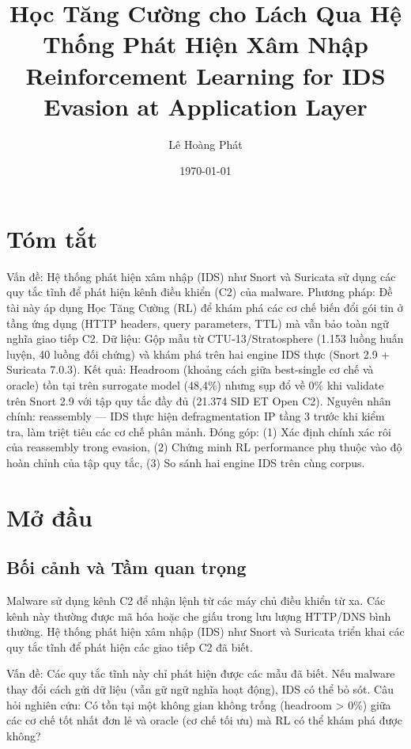 \documentclass[12pt, a4paper, openany]{book}
\title{Học Tăng Cường cho Lách Qua Hệ Thống Phát Hiện Xâm Nhập \\[0.5cm]
       \large Reinforcement Learning for IDS Evasion at Application Layer}
\author{Lê Hoàng Phát}
\date{\today}
\begin{document}
\maketitle

\chapter*{Tóm tắt}

Vấn đề: Hệ thống phát hiện xâm nhập (IDS) như Snort và Suricata sử dụng các quy tắc tĩnh để phát hiện kênh điều khiển (C2) của malware. Phương pháp: Đề tài này áp dụng Học Tăng Cường (RL) để khám phá các cơ chế biến đổi gói tin ở tầng ứng dụng (HTTP headers, query parameters, TTL) mà vẫn bảo toàn ngữ nghĩa giao tiếp C2. Dữ liệu: Gộp mẫu từ CTU-13/Stratosphere (1.153 luồng huấn luyện, 40 luồng đối chứng) và khám phá trên hai engine IDS thực (Snort 2.9 + Suricata 7.0.3). Kết quả: Headroom (khoảng cách giữa best-single cơ chế và oracle) tồn tại trên surrogate model (48,4\%) nhưng sụp đổ về 0\% khi validate trên Snort 2.9 với tập quy tắc đầy đủ (21.374 SID ET Open C2). Nguyên nhân chính: reassembly — IDS thực hiện defragmentation IP tầng 3 trước khi kiểm tra, làm triệt tiêu các cơ chế phân mảnh. Đóng góp: (1) Xác định chính xác rôi của reassembly trong evasion, (2) Chứng minh RL performance phụ thuộc vào độ hoàn chỉnh của tập quy tắc, (3) So sánh hai engine IDS trên cùng corpus.

\tableofcontents
\listoffigures
\listoftables

\mainmatter

\chapter{Mở đầu}

\section{Bối cảnh và Tầm quan trọng}

Malware sử dụng kênh C2 để nhận lệnh từ các máy chủ điều khiển từ xa. Các kênh này thường được mã hóa hoặc che giấu trong lưu lượng HTTP/DNS bình thường. Hệ thống phát hiện xâm nhập (IDS) như Snort và Suricata triển khai các quy tắc tĩnh để phát hiện các giao tiếp C2 đã biết.

Vấn đề: Các quy tắc tĩnh này chỉ phát hiện được các mẫu đã biết. Nếu malware thay đổi cách gửi dữ liệu (vẫn gữ ngữ nghĩa hoạt động), IDS có thể bỏ sót. Câu hỏi nghiên cứu: Có tồn tại một không gian không trống (headroom > 0\%) giữa các cơ chế tốt nhất đơn lẻ và oracle (cơ chế tối ưu) mà RL có thể khám phá được không?
\end{document}
